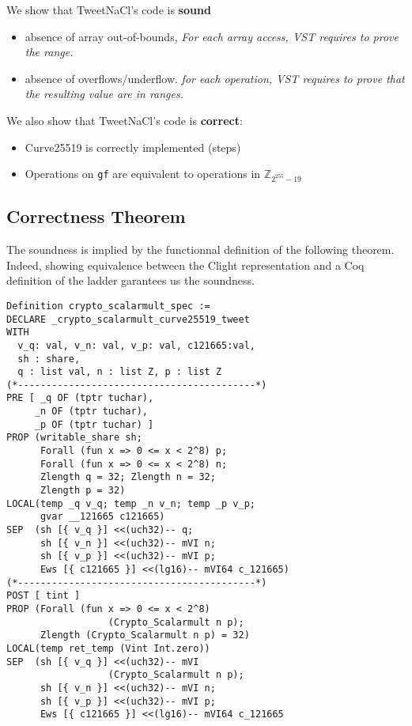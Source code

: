 We show that TweetNaCl's code is \textbf{sound} \ie

\begin{itemize}
\item absence of array out-of-bounds,
\textit{For each array access, VST requires to prove the range.}
\item absence of overflows/underflow.
\textit{for each operation, VST requires to prove that the resulting value are in ranges.}
\end{itemize}

We also show that TweetNaCl's code is \textbf{correct}:

\begin{itemize}
\item Curve25519 is correctly implemented (steps)
\item Operations on \texttt{gf} are equivalent to operations in $\mathbb{Z}_{2^{255}-19}$
\end{itemize}

\subsection{Correctness Theorem}

The soundness is implied by the functionnal definition of the following theorem.
Indeed, showing equivalence between the Clight representation and a Coq
definition of the ladder garantees us the soundness.

\begin{lstlisting}[language=CoqVST]
Definition crypto_scalarmult_spec :=
DECLARE _crypto_scalarmult_curve25519_tweet
WITH
  v_q: val, v_n: val, v_p: val, c121665:val,
  sh : share,
  q : list val, n : list Z, p : list Z
(*------------------------------------------*)
PRE [ _q OF (tptr tuchar),
     _n OF (tptr tuchar),
     _p OF (tptr tuchar) ]
PROP (writable_share sh;
      Forall (fun x => 0 <= x < 2^8) p;
      Forall (fun x => 0 <= x < 2^8) n;
      Zlength q = 32; Zlength n = 32;
      Zlength p = 32)
LOCAL(temp _q v_q; temp _n v_n; temp _p v_p;
      gvar __121665 c121665)
SEP  (sh [{ v_q }] <<(uch32)-- q;
      sh [{ v_n }] <<(uch32)-- mVI n;
      sh [{ v_p }] <<(uch32)-- mVI p;
      Ews [{ c121665 }] <<(lg16)-- mVI64 c_121665)
(*------------------------------------------*)
POST [ tint ]
PROP (Forall (fun x => 0 <= x < 2^8)
                  (Crypto_Scalarmult n p);
      Zlength (Crypto_Scalarmult n p) = 32)
LOCAL(temp ret_temp (Vint Int.zero))
SEP  (sh [{ v_q }] <<(uch32)-- mVI
                  (Crypto_Scalarmult n p);
      sh [{ v_n }] <<(uch32)-- mVI n;
      sh [{ v_p }] <<(uch32)-- mVI p;
      Ews [{ c121665 }] <<(lg16)-- mVI64 c_121665
\end{lstlisting}

